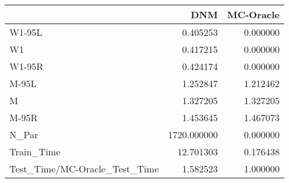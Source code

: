 \begin{tabular}{lrr}
\toprule
{} &          DNM &  MC-Oracle \\
\midrule
W1-95L                        &     0.405253 &   0.000000 \\
W1                            &     0.417215 &   0.000000 \\
W1-95R                        &     0.424174 &   0.000000 \\
M-95L                         &     1.252847 &   1.212462 \\
M                             &     1.327205 &   1.327205 \\
M-95R                         &     1.453645 &   1.467073 \\
N\_Par                         &  1720.000000 &   0.000000 \\
Train\_Time                    &    12.701303 &   0.176438 \\
Test\_Time/MC-Oracle\_Test\_Time &     1.582523 &   1.000000 \\
\bottomrule
\end{tabular}
